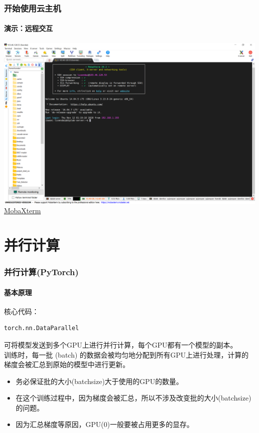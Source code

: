 \documentclass[10pt]{beamer}
\begin{document}
        \begin{frame}
            \frametitle{开始使用云主机}
                \framesubtitle{演示：远程交互}

                \centering

                \href{https://mobaxterm.mobatek.net}{
                    \includegraphics[width=\textwidth]{src/img/SFTP_Shell.png} \\
                    {\small MobaXterm}
                    }

        \end{frame}

    \section{并行计算}
        \begin{frame}[fragile]
            \frametitle{并行计算(PyTorch)}
                \framesubtitle{基本原理}
                    核心代码： \\
                    \begin{lstlisting}
torch.nn.DataParallel                    
                    \end{lstlisting}
                    可将模型发送到多个GPU上进行并行计算，每个GPU都有一个模型的副本。\\
                    训练时，每一批 (batch) 的数据会被均匀地分配到所有GPU上进行处理，计算的梯度会被汇总到原始的模型中进行更新。\\
                    \hspace*{\fill}
                    \begin{itemize}
                        \item 务必保证批的大小(batchsize)大于使用的GPU的数量。
                        \item 在这个训练过程中，因为梯度会被汇总，所以不涉及改变批的大小(batchsize)的问题。
                        \item 因为汇总梯度等原因，GPU(0)一般要被占用更多的显存。
                    \end{itemize}

        \end{frame}
\end{document}
